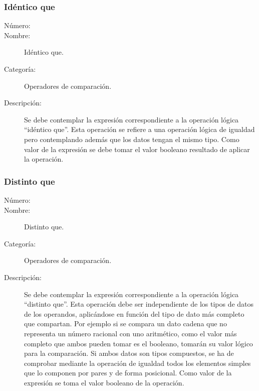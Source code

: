 \subsubsection{Idéntico que}
\begin{framed}
	\begin{description}
		\item [Número:] \cn
		\item [Nombre:] Idéntico que.
		\item [Categoría:] Operadores de comparación.
		\item [Descripción:] Se debe contemplar la expresión correspondiente a la operación lógica ``idéntico que''. Esta operación
		se refiere a una operación lógica de igualdad pero contemplando además que los datos tengan el mismo tipo. Como valor
		de la expresión se debe tomar el valor booleano resultado de aplicar la operación.
	\end {description}
\end{framed}

\subsubsection{Distinto que}
\begin{framed}
	\begin{description}
		\item [Número:] \cn
		\item [Nombre:] Distinto que.
		\item [Categoría:] Operadores de comparación.
		\item [Descripción:] Se debe contemplar la expresión correspondiente a la operación lógica ``distinto que''. Esta operación
		debe ser independiente de los tipos de datos de los operandos, aplicándose en función del tipo de dato más completo que compartan.
		Por ejemplo si se compara un dato cadena que no representa un número racional con uno aritmético, como el valor más completo que
		ambos pueden tomar es el booleano, tomarán su valor lógico para la comparación.  
		Si ambos datos son tipos compuestos, se ha de comprobar mediante la operación de igualdad todos los elementos simples que lo componen
		por pares y de forma posicional.
		Como valor de la expresión se toma el valor booleano de la operación.
	\end {description}
\end{framed}

